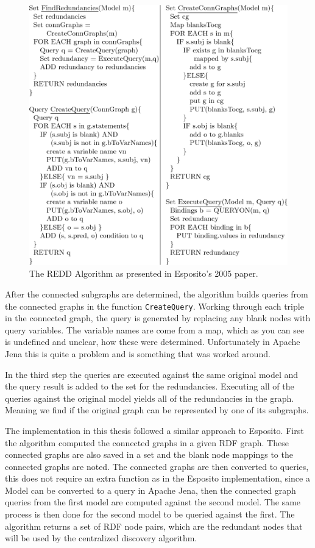 \begin{figure}
	\centering
	\includegraphics[width=\textwidth]{Figures/REDDlisting.png}
    \caption{The REDD Algorithm as presented in Esposito's 2005 paper.}
    \label{fig:EspositoListing}
\end{figure}

After the connected subgraphs are determined, the algorithm builds queries from the connected graphs in the function \texttt{CreateQuery}. Working through each triple in the connected graph, the query is generated by replacing any blank nodes with query variables. The variable names are come from a map, which as you can see is undefined and unclear, how these were determined. Unfortunately in Apache Jena this is quite a problem and is something that was worked around.

In the third step the queries are executed against the same original model and the query result is added to the set for the redundancies. Executing all of the queries against the original model yields all of the redundancies in the graph. Meaning we find if the original graph can be represented by one of its subgraphs.


The implementation in this thesis followed a similar approach to Esposito. First the algorithm computed the connected graphs in a given RDF graph. These connected graphs are also saved in a set and the blank node mappings to the connected graphs are noted. The connected graphs are then converted to queries, this does not require an extra function as in the Esposito implementation, since a Model can be converted to a query in Apache Jena, then the connected graph queries from the first model are computed against the second model. The same process is then done for the second model to be queried against the first. The algorithm returns a set of RDF node pairs, which are the redundant nodes that will be used by the centralized discovery algorithm.





